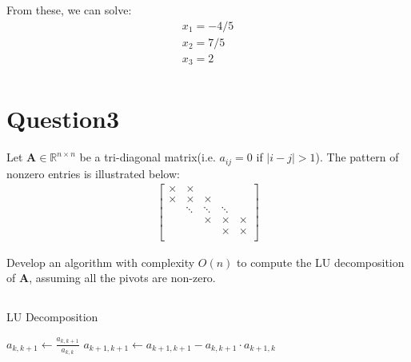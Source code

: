 \documentclass{article}
\newcommand{\R}{\mathbb{R}}
\begin{document}
From these, we can solve:
\begin{align*}
    x_1 = -4/5\\
    x_2 = 7/5\\
    x_3 = 2 \\
\end{align*}

\section*{Question3}
Let \(\bm{A} \in \R^{n \times n}\) be a tri-diagonal matrix(i.e. \(a_{ij} = 0 \) if \( |i - j| > 1\)). The pattern of nonzero entries is illustrated below:
\begin{align*}
    \begin{bmatrix}
        \times & \times & & & \\
        \times & \times & \times & & \\
        & \ddots & \ddots & \ddots & \\
        & &  \times & \times &\times \\
        & & & \times & \times \\
    \end{bmatrix}
\end{align*}

\noindent 
Develop an algorithm with complexity \(\textit{O}(n)\) to compute the LU decomposition of \(\bm{A}\), assuming all the pivots are non-zero.

\subsection*{ }

\begin{algorithm}
    \caption{LU Decomposition}
    \begin{algorithmic}[1]
            \State $a_{k,k+1} \gets \frac{a_{k,k+1}}{a_{k,k}}$
            \State $a_{k+1,k+1} \gets a_{k+1,k+1} - a_{k,k+1} \cdot a_{k+1,k}$
        \EndFor
    \end{algorithmic}
\end{algorithm}
\end{document}
